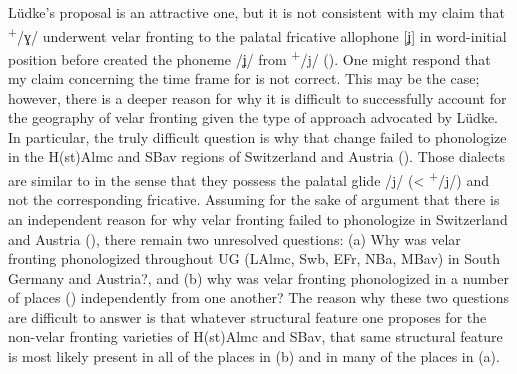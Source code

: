 Lüdke’s proposal is an attractive one, but it is not consistent with my claim that  \textsuperscript{+}/ɣ/ underwent velar fronting to the palatal fricative allophone [ʝ] in word-initial position before  created the phoneme /ʝ/ from  \textsuperscript{+}/j/ (). One might respond that my claim concerning the time frame for  is not correct. This may be the case; however, there is a deeper reason for why it is difficult to successfully account for the geography of velar fronting given the type of approach advocated by Lüdke. In particular, the truly difficult question is why that change failed to phonologize in the H(st)Almc and SBav regions of Switzerland and Austria (). Those dialects are similar to  in the sense that they possess the palatal glide /j/ (< \textsuperscript{+}/j/) and not the corresponding fricative. Assuming for the sake of argument that there is an independent reason for why velar fronting failed to phonologize in Switzerland and Austria (), there remain two unresolved questions: (a) Why was velar fronting phonologized throughout UG (LAlmc, Swb, EFr, NBa, MBav) in South Germany and Austria?, and (b) why was velar fronting phonologized in a number of places () independently from one another? The reason why these two questions are difficult to answer is that whatever structural feature one proposes for the non-velar fronting varieties of H(st)Almc and SBav, that same structural feature is most likely present in all of the places in (b) and in many of the places in (a).
